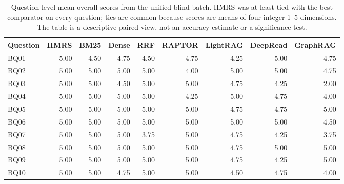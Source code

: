 \begin{table}[!t]
\centering
\scriptsize
\setlength{\tabcolsep}{3pt}
\caption{Question-level mean overall scores from the unified blind batch.
HMRS was at least tied with the best comparator on every question; ties are common
because scores are means of four integer 1--5 dimensions. The table is a
descriptive paired view, not an accuracy estimate or a significance test.}
\label{tab:external-question-level}
\begin{tabular}{@{}lrrrrrrrr@{}}
\toprule
Question & HMRS & BM25 & Dense & RRF & RAPTOR & LightRAG & DeepRead & GraphRAG\\
\midrule
BQ01 & 5.00 & 4.50 & 4.75 & 4.50 & 4.75 & 4.25 & 5.00 & 4.75\\
BQ02 & 5.00 & 5.00 & 5.00 & 5.00 & 4.00 & 5.00 & 5.00 & 4.75\\
BQ03 & 5.00 & 5.00 & 4.50 & 5.00 & 5.00 & 4.75 & 4.25 & 2.00\\
BQ04 & 5.00 & 5.00 & 5.00 & 5.00 & 4.25 & 5.00 & 4.75 & 4.00\\
BQ05 & 5.00 & 5.00 & 5.00 & 5.00 & 5.00 & 4.75 & 4.75 & 5.00\\
BQ06 & 5.00 & 5.00 & 5.00 & 5.00 & 5.00 & 5.00 & 5.00 & 4.50\\
BQ07 & 5.00 & 5.00 & 5.00 & 3.75 & 5.00 & 4.75 & 4.25 & 3.75\\
BQ08 & 5.00 & 5.00 & 5.00 & 5.00 & 5.00 & 4.75 & 5.00 & 5.00\\
BQ09 & 5.00 & 5.00 & 5.00 & 5.00 & 5.00 & 4.75 & 4.25 & 5.00\\
BQ10 & 5.00 & 5.00 & 4.75 & 5.00 & 5.00 & 4.50 & 4.75 & 4.00\\
\bottomrule
\end{tabular}
\end{table}

